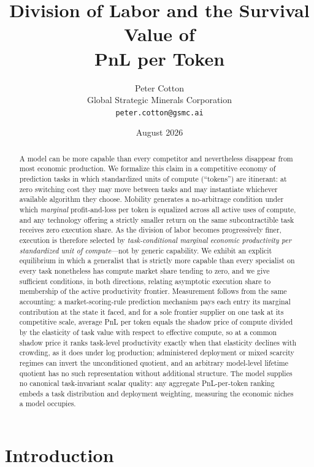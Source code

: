 \documentclass[11pt]{article}
\title{Division of Labor and the Survival Value of\\ PnL per Token}
\author{Peter Cotton\\ \small Global Strategic Minerals Corporation\\ \small\texttt{peter.cotton@gsmc.ai}}
\date{August 2026}
\theoremstyle{definition}
\theoremstyle{remark}
\begin{document}
\maketitle

\begin{abstract}
A model can be more capable than every competitor and nevertheless disappear from most economic production. We formalize this claim in a competitive economy of prediction tasks in which standardized units of compute (``tokens'') are itinerant: at zero switching cost they may move between tasks and may instantiate whichever available algorithm they choose. Mobility generates a no-arbitrage condition under which \emph{marginal} profit-and-loss per token is equalized across all active uses of compute, and any technology offering a strictly smaller return on the same subcontractible task receives zero execution share. As the division of labor becomes progressively finer, execution is therefore selected by \emph{task-conditional marginal economic productivity per standardized unit of compute}---not by generic capability. We exhibit an explicit equilibrium in which a generalist that is strictly more capable than every specialist on every task nonetheless has compute market share tending to zero, and we give sufficient conditions, in both directions, relating asymptotic execution share to membership of the active productivity frontier. Measurement follows from the same accounting: a market-scoring-rule prediction mechanism pays each entry its marginal contribution at the state it faced, and for a sole frontier supplier on one task at its competitive scale, average PnL per token equals the shadow price of compute divided by the elasticity of task value with respect to effective compute, so at a common shadow price it ranks task-level productivity exactly when that elasticity declines with crowding, as it does under log production; administered deployment or mixed scarcity regimes can invert the unconditioned quotient, and an arbitrary model-level lifetime quotient has no such representation without additional structure. The model supplies no canonical task-invariant scalar quality: any aggregate PnL-per-token ranking embeds a task distribution and deployment weighting, measuring the economic niches a model occupies.
\end{abstract}

\section{Introduction}
\end{document}
